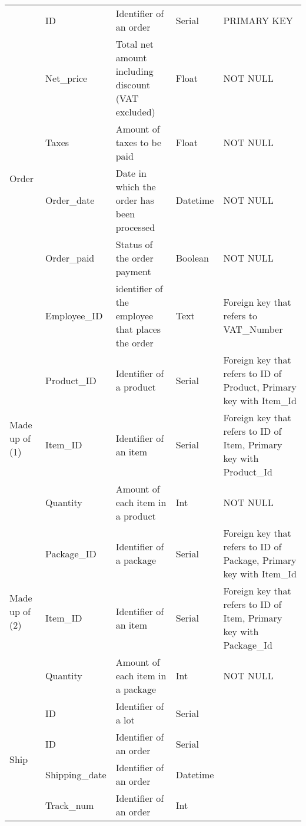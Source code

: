 \begin{longtable}{|p{}|p{} |p{}|p{}|p{} |}
\multirow{6}{*}{Order} & ID & Identifier of an order & Serial & PRIMARY KEY \\\cline{2-5}
& Net\_price &  Total net amount including discount (VAT excluded) & Float & NOT NULL \\\cline{2-5}
& Taxes & Amount of taxes to be paid & Float & NOT NULL \\\cline{2-5}
& Order\_date & Date in which the order has been processed & Datetime & NOT NULL \\\cline{2-5}
& Order\_paid & Status of the order payment & Boolean & NOT NULL \\\cline{2-5}
& Employee\_ID & identifier of the employee that places the order & Text & Foreign key that refers to VAT\_Number \\\hline

\multirow{3}{*}{Made up of (1)} & Product\_ID & Identifier of a product & Serial & Foreign key that refers to ID of Product, Primary key with Item\_Id \\\cline{2-5}
& Item\_ID & Identifier of an item & Serial &  Foreign key that refers to ID of Item, Primary key with Product\_Id\\\cline{2-5}
& Quantity & Amount of each item in a product & Int & NOT NULL  \\\hline

\multirow{3}{*}{Made up of (2)} & Package\_ID & Identifier of a package & Serial & Foreign key that refers to ID of Package, Primary key with Item\_Id \\\cline{2-5}
& Item\_ID & Identifier of an item & Serial &  Foreign key that refers to ID of Item, Primary key with Package\_Id\\\cline{2-5}
& Quantity & Amount of each item in a package & Int & NOT NULL  \\\hline

\multirow{4}{*}{Ship} & ID & Identifier of a lot & Serial & \\\cline{2-5}
& ID & Identifier of an order & Serial & \\\cline{2-5}
& Shipping\_date & Identifier of an order & Datetime & \\\cline{2-5}
& Track\_num & Identifier of an order & Int & \\\hline




\end{longtable}
